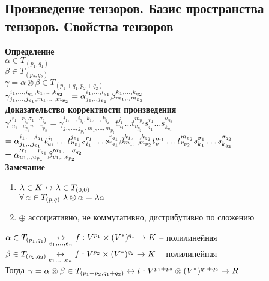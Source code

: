 \documentclass[12pt]{article}
\begin{document}
\subsection{Произведение тензоров. Базис пространства тензоров. Свойства тензоров}
\textbf{Определение}\\
$\alpha \in T_{(p_1, q_1)}$\\
$\beta \in T_{(p_2, q_2)}$\\
$\gamma = \alpha \otimes \beta \in T_{(p_1+q_1, p_2+q_2)}$\\
$\gamma_{j_1,\ldots,j_{p_1},m_1, \ldots, m_{p_2}}^{i_1,\ldots, i_{q_1},k_1,\ldots,k_{q_2}} = \alpha_{j_1, \ldotp, j_{p_1}}^{i_1, \ldots, i_{q_1}}\beta_{m_1, \ldotp, m_{p_2}}^{k_1, \ldots, k_{q_2}}$\\
\textbf{Доказательство корректности произведения}\\
$\gamma'^{r_1 \ldots r_{q_1} \sigma_1 \ldots \sigma_{q_2}}_{u_1\ldots u_{p_1}v_1\ldots v_{p_2}} = \gamma_{j_1,\ldots,j_{p_1},m_1, \ldots, m_{p_2}}^{i_1,\ldots, i_{q_1},k_1,\ldots,k_{q_2}} t_{u_1}^{j_1}\ldots t_{v_{p_2}}^{m_{p_2}} s_{i_1}^{r_1}\ldots s_{k_{q_2}}^{\sigma_{q_2}}$\\
$ = \alpha_{j_1, \ldotp, j_{p_1}}^{i_1, \ldots, i_{q_1}}t_{u_1}^{j_1}\ldots t_{u_{p_1}}^{j_{p_1}}s_{i_1}^{r_1}\ldots s_{r_{q_1}}^{r_{q_1}}\beta_{m_1, \ldotp, m_{p_2}}^{k_1, \ldots, k_{q_2}}t_{v_1}^{m_1}\ldots t_{v_{p_2}}^{m_{p_2}}s_{k_1}^{\sigma_1}\ldots s_{k_{q_2}}^{\sigma_{q_2}}$\\
$ = \alpha'^{r_1, \ldots, r_{q_1}}_{u_1, \ldotp, u_{p_1}}\beta'^{\sigma_1, \ldots, \sigma_{q_2}}_{v_1, \ldotp, v_{p_2}}$\\
\textbf{Замечание}
\begin{enumerate}
    \item $\lambda \in K \leftrightarrow \lambda \in T_{(0,0)}$\\
    $\forall\, \alpha \in T_{(p,q)}\ \lambda \otimes \alpha = \lambda\alpha$
    \item $\oplus$ ассоциативно, не коммутативно, дистрибутивно по сложению
\end{enumerate}
$\alpha \in T_{(p_1, q_1)} \underset{e_1, \ldots, e_n}{\leftrightarrow} f: V^{p_1}\times (V^*)^{q_1} \rightarrow K$ -- полилинейная\\
$\beta \in T_{(p_2, q_2)} \underset{e_1, \ldots, e_n}{\leftrightarrow} f: V^{p_2}\times (V^*)^{q_2} \rightarrow K$ -- полилинейная\\
Тогда $\gamma = \alpha \otimes \beta \in T_{(p_1 + p_2, q_1 + q_2)} \leftrightarrow t: V^{p_1+p_2}\otimes (V^*)^{q_1+q_2} \rightarrow R$\\
\end{document}
